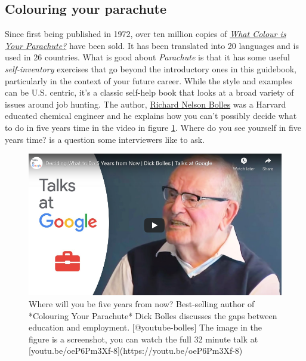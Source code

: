 \documentclass[
]{book}
\begin{document}
\hypertarget{parachute}{%
\subsection{Colouring your parachute}\label{parachute}}

Since first being published in 1972, over ten million copies of \emph{\href{https://en.wikipedia.org/wiki/What_Color_is_Your_Parachute\%3F}{What Colour is Your Parachute?}} have been sold. It has been translated into 20 languages and is used in 26 countries. What is good about \emph{Parachute} is that it has some useful \emph{self-inventory} exercises that go beyond the introductory ones in this guidebook, particularly in the context of your future career. While the style and examples can be U.S. centric, it's a classic self-help book that looks at a broad variety of issues around job hunting. The author, \href{https://en.wikipedia.org/wiki/Richard_Nelson_Bolles}{Richard Nelson Bolles} was a Harvard educated chemical engineer and he explains how you can't possibly decide what to do in five years time in the video in figure \ref{fig:bolles-fig}. Where do you see yourself in five years time? is a question some interviewers like to ask.

\begin{figure}

{\centering \includegraphics[width=0.99\linewidth]{images/youtube-bolles} 

}

\caption{Where will you be five years from now? Best-selling author of *Colouring Your Parachute* Dick Bolles discusses the gaps between education and employment. [@youtube-bolles] The image in the figure is a screenshot, you can watch the full 32 minute talk at [youtu.be/oeP6Pm3Xf-8](https://youtu.be/oeP6Pm3Xf-8) }\label{fig:bolles-fig}
\end{figure}
\end{document}
